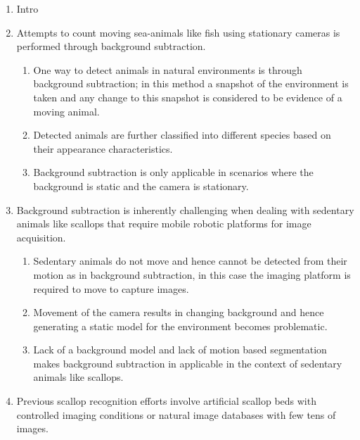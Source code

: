 \documentclass {udthesis}
\begin{document}
\begin{enumerate}[label=Section \arabic*:, start=0]
\item Intro

\item Attempts to count moving sea-animals like fish using stationary cameras is performed through background subtraction.

  \begin{enumerate} [label=Para \arabic*:, start=1]
   
   \item One way to detect animals in natural environments is through background subtraction; in this method a snapshot of the environment is taken and any change to this snapshot is considered to be evidence of a moving animal.
   
   \item Detected animals are further classified into different species based on their appearance characteristics.
   
   \item Background subtraction is only applicable in scenarios where the background is static and the camera is stationary.   
   
  \end{enumerate}


\item Background subtraction is inherently challenging when dealing with sedentary animals like scallops that require mobile robotic platforms for image acquisition.

  \begin{enumerate} [label=Para \arabic*:, start=1]
      
   \item Sedentary animals do not move and hence cannot be detected from their motion as in background subtraction, in this case the imaging platform is required to move to capture images.
   
   \item Movement of the camera results in changing background and hence generating a static model for the environment becomes problematic.
   
   \item Lack of a background model and lack of motion based segmentation makes background subtraction in applicable in the context of sedentary animals like scallops.
   
  \end{enumerate}

\item Previous scallop recognition efforts involve artificial scallop beds with controlled imaging conditions or natural image databases with few tens of images.


\end{enumerate}
\end{document}
